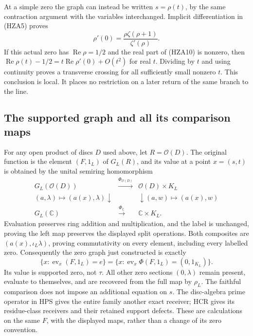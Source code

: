 \documentclass[11pt]{article}
\theoremstyle{definition}
\begin{document}
At a simple zero the graph can instead be written $s=\rho(t)$,
by the same contraction argument with the variables interchanged.
Implicit differentiation in (HZA5) proves
\begin{equation}\tag{HZA10}
 \rho'(0)=\frac{\rho\zeta(\rho+1)}{\zeta'(\rho)}.
\end{equation}
If this actual zero has $\operatorname{Re}\rho=1/2$ and the real
part of (HZA10) is nonzero, then
$\operatorname{Re}\rho(t)-1/2=t\operatorname{Re}\rho'(0)+O(t^2)$
for real $t$. Dividing by $t$ and using continuity proves a
transverse crossing for all sufficiently small nonzero $t$.
This conclusion is local. It places no restriction on a later
return of the same branch to the line.

\subsection{The supported graph and all its comparison maps}

For any open product of discs $D$ used above, let $R=\mathcal O(D)$.
The original function is the element $(F,1_L)$ of $G_L(R)$, and
its value at a point $x=(s,t)$ is obtained by the unital semiring
homomorphism
\begin{equation}\tag{HZA11}
\begin{array}{ccc}
 G_L(\mathcal O(D))&\xrightarrow{\Phi_{\mathcal O(D)}}&
                 \mathcal O(D)\times K_L\\
 {\scriptstyle(a,\lambda)\mapsto(a(x),\lambda)}\downarrow&&
       \downarrow{\scriptstyle(a,w)\mapsto(a(x),w)}\\
 G_L(\mathbb C)&\xrightarrow{\Phi_{\mathbb C}}&\mathbb C\times K_L.
\end{array}
\end{equation}
Evaluation preserves ring addition and multiplication, and the label
is unchanged, proving the left map preserves the displayed split
operations. Both composites are $(a(x),\iota_L\lambda)$, proving
commutativity on every element, including every labelled zero.
Consequently the zero graph just constructed is exactly
\begin{equation}\tag{HZA12}
 \{x:\operatorname{ev}_x(F,1_L)=e\}
 =\{x:\operatorname{ev}_x\Phi(F,1_L)=(0,1_{K_L})\}.
\end{equation}
Its value is supported zero, not $\tau$. All other zero sections
$(0,\lambda)$ remain present, evaluate to themselves, and are
recovered from the full map by $\rho_L$. The faithful comparison
does not impose an additional equation on $s$. The disc-algebra
prime operator in HPS gives the entire family another exact receiver;
HCR gives its residue-class receivers and their retained support
defects. These are calculations on the same $F$, with the displayed
maps, rather than a change of its zero convention.
\end{document}

